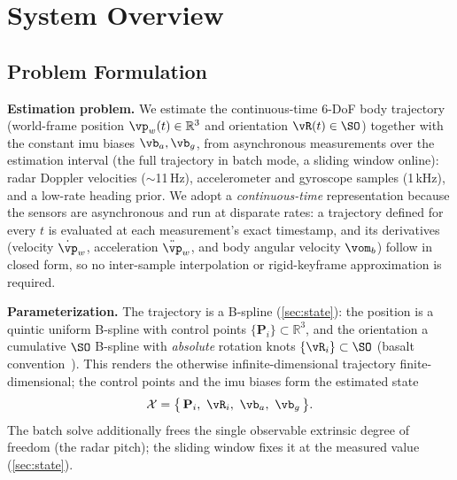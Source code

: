 \section{System Overview}
\label{sec:overview}

\subsection{Problem Formulation}
\label{sec:problem}

\textbf{Estimation problem.}
We estimate the continuous-time 6-DoF body trajectory (world-frame
position $\vp_w(t)\in\mathbb{R}^3$ and orientation $\vR(t)\in\SO$)
together with the constant \ac{imu} biases $\vb_a,\vb_g$, from asynchronous
measurements over the estimation interval (the full trajectory in batch
mode, a sliding window online): radar Doppler velocities ($\sim$11\,Hz),
accelerometer and gyroscope samples (1\,kHz), and a low-rate heading
prior.  We adopt a \emph{continuous-time} representation because the
sensors are asynchronous and run at disparate rates: a trajectory defined
for every $t$ is evaluated at each measurement's exact timestamp, and its
derivatives (velocity $\dot{\vp}_w$, acceleration $\ddot{\vp}_w$, and
body angular velocity $\vom_b$) follow in closed form, so no
inter-sample interpolation or rigid-keyframe approximation is required.

\textbf{Parameterization.}
The trajectory is a B-spline (\autoref{sec:state}): the position is a
quintic uniform B-spline with control points
$\{\mathbf{P}_i\}\subset\mathbb{R}^3$, and the orientation a cumulative
$\SO$ B-spline with \emph{absolute} rotation knots
$\{\vR_i\}\subset\SO$ (basalt convention~\cite{usenko2020basalt}).
This renders the otherwise infinite-dimensional trajectory
finite-dimensional; the control points and the \ac{imu} biases form the
estimated state
\begin{equation}
  \mathcal{X} = \bigl\{\,\mathbf{P}_i,\ \vR_i,\ \vb_a,\ \vb_g\,\bigr\}.
  \label{eq:state}
\end{equation}
The batch solve additionally frees the single observable extrinsic degree
of freedom (the radar pitch); the sliding window fixes it at the measured
value (\autoref{sec:state}).


